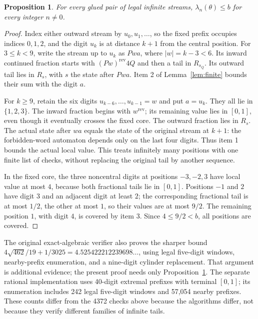\documentclass[11pt,a4paper]{article}
\newtheorem{proposition}[theorem]{Proposition}
\begin{document}
\begin{proposition}\label{prop:noncentral}
For every glued pair of legal infinite streams,
$\lambda_n(\theta)\le b$ for every integer $n\ne0$.
\end{proposition}
\begin{proof}
Index either outward stream by $u_0,u_1,\ldots$, so the fixed prefix
occupies indices $0,1,2$, and the digit $u_k$ is at distance $k+1$
from the central position. For $3\le k<9$, write the stream up to
$u_k$ as $Pwa$, where $|w|=k-3<6$. Its inward continued fraction
starts with $(Pw)^{\mathrm{rev}}4Q$ and then a tail in $R_{s_Q}$.
Its outward tail lies in $R_s$, with $s$ the state after $Pwa$.
Item 2 of Lemma~\ref{lem:finite} bounds their sum with the digit $a$.

For $k\ge9$, retain the six digits $u_{k-6},\ldots,u_{k-1}=w$
and put $a=u_k$. They all lie in $\{1,2,3\}$. The inward fraction
begins with $w^{\mathrm{rev}}$; its remaining value lies in $[0,1]$,
even though it eventually crosses the fixed core. The outward fraction
lies in $R_s$. The actual state after $wa$ equals the state of the
original stream at $k+1$: the forbidden-word automaton depends only on
the last four digits. Thus item 1 bounds the actual local value.
This treats infinitely many positions with one finite list of checks,
without replacing the original tail by another sequence.

In the fixed core, the three noncentral digits at positions $-3,-2,3$ have local value at most $4$, because
both fractional tails lie in $[0,1]$. Positions $-1$ and $2$ have digit
$3$ and an adjacent digit at least $2$; the corresponding fractional
tail is at most $1/2$, the other at most $1$, so their values are at
most $9/2$. The remaining position $1$, with digit $4$, is covered
by item 3. Since $4\le9/2<b$, all positions are covered.
\end{proof}

The original exact-algebraic verifier also proves the sharper bound
$4\sqrt{462}/19+1/3025=4.525422212239698\ldots$, using legal five-digit
windows, nearby-prefix enumeration, and a nine-digit cylinder replacement.
That argument is additional evidence; the present proof needs only
Proposition~\ref{prop:noncentral}. The separate rational implementation
uses 40-digit extremal prefixes with terminal $[0,1]$; its enumeration
includes 242 legal five-digit windows and 57,054 nearby prefixes.
These counts differ from the 4372 checks above because the algorithms
differ, not because they verify different families of infinite tails.
\end{document}
